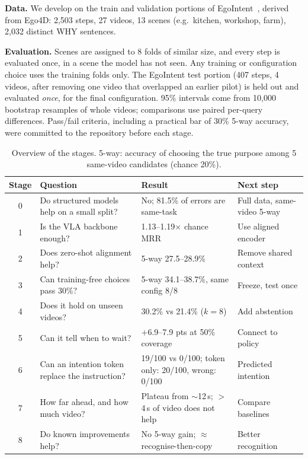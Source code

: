 \documentclass[conference,a4paper]{IEEEtran}
\begin{document}
\textbf{Data.} We develop on the train and validation portions of EgoIntent~\cite{egointent2026}, derived from Ego4D: 2,503 steps, 27 videos, 13 scenes (e.g.\ kitchen, workshop, farm), 2,032 distinct WHY sentences.

\textbf{Evaluation.} Scenes are assigned to 8 folds of similar size, and every step is evaluated once, in a scene the model has not seen. Any training or configuration choice uses the training folds only. The EgoIntent test portion (407 steps, 4 videos, after removing one video that overlapped an earlier pilot) is held out and evaluated \emph{once}, for the final configuration. 95\% intervals come from 10,000 bootstrap resamples of whole videos; comparisons use paired per-query differences. Pass/fail criteria, including a practical bar of 30\% 5-way accuracy, were committed to the repository before each stage.

\begin{table}[t]
\caption{Overview of the stages. 5-way: accuracy of choosing the true purpose among 5 same-video candidates (chance 20\%).}
\label{tab:stages}
\centering
\footnotesize
\setlength{\tabcolsep}{3pt}
\begin{tabular}{@{}cp{2.5cm}p{2.6cm}p{2.0cm}@{}}
\toprule
Stage & Question & Result & Next step \\
\midrule
0 & Do structured models help on a small split? & No; 81.5\% of errors are same-task & Full data, same-video 5-way \\
1 & Is the VLA backbone enough? & 1.13--1.19$\times$ chance MRR & Use aligned encoder \\
2 & Does zero-shot alignment help? & 5-way 27.5--28.9\% & Remove shared context \\
3 & Can training-free choices pass 30\%? & 5-way 34.1--38.7\%, same config 8/8 & Freeze, test once \\
4 & Does it hold on unseen videos? & 30.2\% vs 21.4\% ($k=8$) & Add abstention \\
5 & Can it tell when to wait? & $+$6.9--7.9 pts at 50\% coverage & Connect to policy \\
6 & Can an intention token replace the instruction? & 19/100 vs 0/100; token only: 20/100, wrong: 0/100 & Predicted intention \\
7 & How far ahead, and how much video? & Plateau from $\sim$12\,s; $>$4\,s of video does not help & Compare baselines \\
8 & Do known improvements help? & No 5-way gain; $\approx$ recognise-then-copy & Better recognition \\
\bottomrule
\end{tabular}
\end{table}
\end{document}
